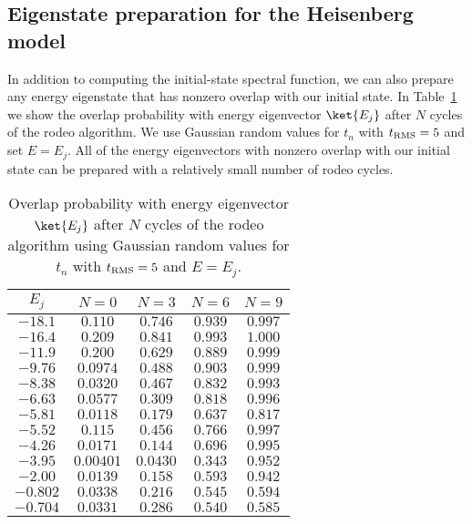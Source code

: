 \subsection{Eigenstate preparation for the Heisenberg model}

In addition to computing the initial-state spectral function, we can also prepare any energy eigenstate that has nonzero overlap with our initial state. In Table~\ref{overlap} we show the overlap probability with energy eigenvector $\ket{E_j}$ after $N$ cycles of the rodeo algorithm.  We use Gaussian random values for $t_n$ with $t_{\rm RMS} = 5$ and set $E=E_{j}$.  All of the energy eigenvectors with nonzero overlap with our initial state can be prepared with a relatively small number of rodeo cycles. 

\begin{table}[h]
\begin{center}
\caption{Overlap probability with energy eigenvector $\ket{E_j}$ after $N$ cycles of the rodeo algorithm using Gaussian random values for $t_n$ with $t_{\rm RMS} = 5$ and $E=E_{j}$.}
\label{overlap}
\begin{tabular}{|c|c|c|c|c|}
\hline
$E_j$ & $N=0$ & $N = 3$ & $N = 6$ & $N= 9$ \\
\hline
$ -18.1 $ & $  0.110 $ & $  0.746 $ & $  0.939 $ & $  0.997  $ \\
$ -16.4 $ & $  0.209 $ & $  0.841 $ & $  0.993 $ & $  1.000  $ \\
$ -11.9 $ & $  0.200 $ & $  0.629 $ & $  0.889 $ & $  0.999  $ \\
$ -9.76 $ & $  0.0974 $ & $  0.488 $ & $  0.903 $ & $  0.999  $ \\
$ -8.38 $ & $  0.0320 $ & $  0.467 $ & $  0.832 $ & $  0.993  $ \\
$ -6.63 $ & $  0.0577 $ & $  0.309 $ & $  0.818 $ & $  0.996  $ \\
$ -5.81 $ & $  0.0118 $ & $  0.179 $ & $  0.637 $ & $  0.817  $ \\
$ -5.52 $ & $  0.115 $ & $  0.456 $ & $  0.766 $ & $  0.997  $ \\
$ -4.26 $ & $  0.0171 $ & $  0.144 $ & $  0.696 $ & $  0.995  $ \\
$ -3.95 $ & $  0.00401 $ & $  0.0430 $ & $  0.343 $ & $  0.952  $ \\
$ -2.00 $ & $  0.0139 $ & $  0.158 $ & $  0.593 $ & $  0.942  $ \\
$ -0.802 $ & $  0.0338 $ & $  0.216 $ & $  0.545 $ & $  0.594  $ \\
$ -0.704 $ & $  0.0331 $ & $  0.286 $ & $  0.540 $ & $  0.585  $ \\

\end{tabular}
\end{center}
\end{table}
